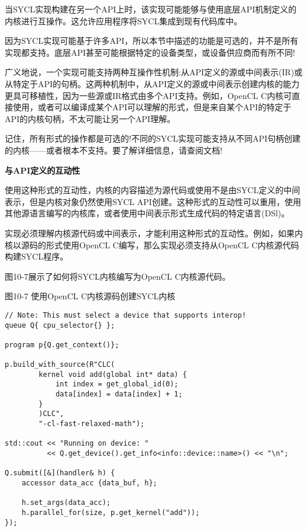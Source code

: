 当SYCL实现构建在另一个API上时，该实现可能能够与使用底层API机制定义的内核进行互操作。这允许应用程序将SYCL集成到现有代码库中。\par

因为SYCL实现可能基于许多API，所以本节中描述的功能是可选的，并不是所有实现都支持。底层API甚至可能根据特定的设备类型，或设备供应商而有所不同!\par

广义地说，一个实现可能支持两种互操作性机制:从API定义的源或中间表示(IR)或从特定于API的句柄。这两种机制中，从API定义的源或中间表示创建内核的能力更具可移植性，因为一些源或IR格式由多个API支持。例如，OpenCL C内核可直接使用，或者可以编译成某个API可以理解的形式，但是来自某个API的特定于API的内核句柄，不太可能让另一个API理解。\par

\begin{tcolorbox}[colback=red!5!white,colframe=red!75!black]
记住，所有形式的操作都是可选的!不同的SYCL实现可能支持从不同API句柄创建的内核——或者根本不支持。要了解详细信息，请查阅文档!
\end{tcolorbox}

\hspace*{\fill} \par %
\textbf{与API定义的互动性}

使用这种形式的互动性，内核的内容描述为源代码或使用不是由SYCL定义的中间表示，但是内核对象仍然使用SYCL API创建。这种形式的互动性可以重用，使用其他源语言编写的内核库，或者使用中间表示形式生成代码的特定语言(DSl)。\par

实现必须理解内核源代码或中间表示，才能利用这种形式的互动性。例如，如果内核以源码的形式使用OpenCL C编写，那么实现必须支持从OpenCL C内核源代码构建SYCL程序。\par

图10-7展示了如何将SYCL内核编写为OpenCL C内核源代码。\par

\hspace*{\fill} \par %
图10-7 使用OpenCL C内核源码创建SYCL内核
\begin{lstlisting}[caption={}]
// Note: This must select a device that supports interop!
queue Q{ cpu_selector{} };

program p{Q.get_context()};

p.build_with_source(R"CLC(
		kernel void add(global int* data) {
			int index = get_global_id(0);
			data[index] = data[index] + 1;
		}
		)CLC",
		"-cl-fast-relaxed-math");
		
std::cout << "Running on device: "
		  << Q.get_device().get_info<info::device::name>() << "\n";

Q.submit([&](handler& h) {
	accessor data_acc {data_buf, h};
	
	h.set_args(data_acc);
	h.parallel_for(size, p.get_kernel("add"));
});
\end{lstlisting}

